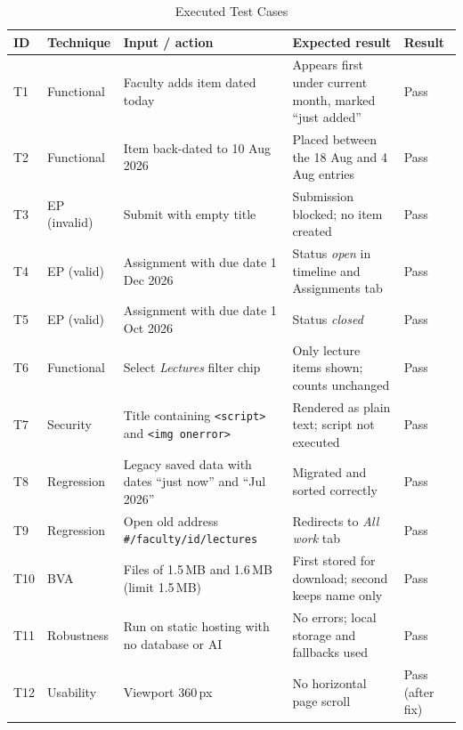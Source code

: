 \documentclass[conference]{IEEEtran}
\begin{document}
\begin{table}[t]
\caption{Executed Test Cases}
\label{tab:tests}
\centering\footnotesize
\begin{tabularx}{\textwidth}{@{}l l Y Y l@{}}
\toprule
\textbf{ID} & \textbf{Technique} & \textbf{Input / action} & \textbf{Expected result} & \textbf{Result}\\
\midrule
T1 & Functional & Faculty adds item dated today & Appears first under current month, marked ``just added'' & Pass\\
T2 & Functional & Item back-dated to 10 Aug 2026 & Placed between the 18 Aug and 4 Aug entries & Pass\\
T3 & EP (invalid) & Submit with empty title & Submission blocked; no item created & Pass\\
T4 & EP (valid) & Assignment with due date 1 Dec 2026 & Status \emph{open} in timeline and Assignments tab & Pass\\
T5 & EP (valid) & Assignment with due date 1 Oct 2026 & Status \emph{closed} & Pass\\
T6 & Functional & Select \emph{Lectures} filter chip & Only lecture items shown; counts unchanged & Pass\\
T7 & Security & Title containing \verb|<script>| and \verb|<img onerror>| & Rendered as plain text; script not executed & Pass\\
T8 & Regression & Legacy saved data with dates ``just now'' and ``Jul 2026'' & Migrated and sorted correctly & Pass\\
T9 & Regression & Open old address \texttt{\#/faculty/id/lectures} & Redirects to \emph{All work} tab & Pass\\
T10 & BVA & Files of 1.5\,MB and 1.6\,MB (limit 1.5\,MB) & First stored for download; second keeps name only & Pass\\
T11 & Robustness & Run on static hosting with no database or AI & No errors; local storage and fallbacks used & Pass\\
T12 & Usability & Viewport 360\,px & No horizontal page scroll & Pass (after fix)\\
\bottomrule
\end{tabularx}
\end{table}
\end{document}
